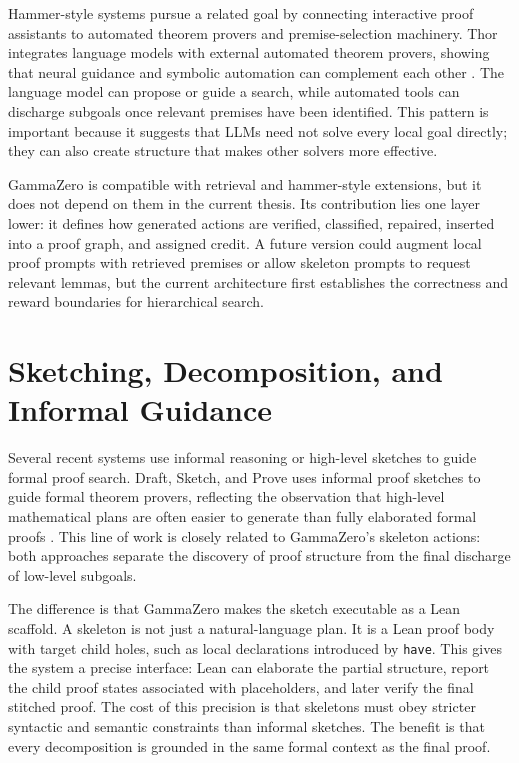 Hammer-style systems pursue a related goal by connecting interactive proof assistants to automated
theorem provers and premise-selection machinery. Thor integrates language models with external
automated theorem provers, showing that neural guidance and symbolic automation can complement each
other \citep{jiang2022thor}. The language model can propose or guide a search, while automated tools can
discharge subgoals once relevant premises have been identified. This pattern is important because it
suggests that LLMs need not solve every local goal directly; they can also create structure that makes
other solvers more effective.

GammaZero is compatible with retrieval and hammer-style extensions, but it does not depend on them in
the current thesis. Its contribution lies one layer lower: it defines how generated actions are verified,
classified, repaired, inserted into a proof graph, and assigned credit. A future version could augment
local proof prompts with retrieved premises or allow skeleton prompts to request relevant lemmas,
but the current architecture first establishes the correctness and reward boundaries for hierarchical
search.

\section{Sketching, Decomposition, and Informal Guidance}

Several recent systems use informal reasoning or high-level sketches to guide formal proof search.
Draft, Sketch, and Prove uses informal proof sketches to guide formal theorem provers, reflecting the
observation that high-level mathematical plans are often easier to generate than fully elaborated formal
proofs \citep{jiang2022draft}. This line of work is closely related to GammaZero's skeleton actions: both
approaches separate the discovery of proof structure from the final discharge of low-level subgoals.

The difference is that GammaZero makes the sketch executable as a Lean scaffold. A skeleton is not just
a natural-language plan. It is a Lean proof body with target child holes, such as local declarations
introduced by \texttt{have}. This gives the system a precise interface: Lean can elaborate the partial
structure, report the child proof states associated with placeholders, and later verify the final stitched
proof. The cost of this precision is that skeletons must obey stricter syntactic and semantic constraints
than informal sketches. The benefit is that every decomposition is grounded in the same formal context
as the final proof.

